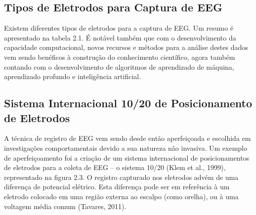   

    \subsection{Tipos de Eletrodos para Captura de EEG}

    Existem diferentes tipos de eletrodos para a captura de EEG. Um resumo é apresentado na tabela 2.1. É notável também que com o desenvolvimento da capacidade computacional, novos recursos e métodos para a análise destes dados vem sendo benéficos à construção do conhecimento científico, agora também contando com o desenvolvimento de algoritmos de aprendizado de máquina, aprendizado profundo e inteligência artificial. 
  
\subsection{Sistema Internacional 10/20 de Posicionamento de Eletrodos}

A técnica de registro de EEG vem sendo desde então aperfeiçoada e escolhida em investigações 
comportamentais devido a sua natureza não invasiva.
 Um exemplo de aperfeiçoamento foi a criação de um sistema internacional de posicionamentos 
 de eletrodos para a coleta de EEG – o sistema 10/20 (Klem et al., 1999), 
 representado na figura 2.3. 
 O registro capturado nos eletrodos advém de uma 
 diferença de potencial elétrico. Esta diferença pode ser em 
 referência à um eletrodo colocado em uma região externa ao escalpo (como orelha), 
 ou à uma voltagem média comum (Tavares, 2011).






